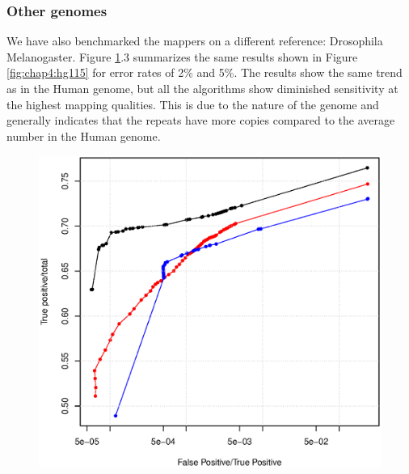 \subsubsection{Other genomes}

We have also benchmarked the mappers on a different reference:
Drosophila Melanogaster. Figure \ref{fig:chap4:dmel}.3 summarizes the
same results shown in Figure \ref{fig:chap4:hg115} for error rates of
2\% and 5\%. The results show the same trend as in the Human genome,
but all the algorithms show diminished sensitivity at the highest
mapping qualities. This is due to the nature of the genome and
generally indicates that the repeats have more copies compared to the
average number in the Human genome. 

\begin{figure}[h]
   \label{fig:chap4:dmel}
	\begin{minipage}[b]{0.5\linewidth}
	  \centering
	  \includegraphics[width=\textwidth]{figures/chap4_dmel_2_15}
   \end{minipage}
	\begin{minipage}[b]{0.5\linewidth}
	  \centering

\end{minipage}
\end{figure}
